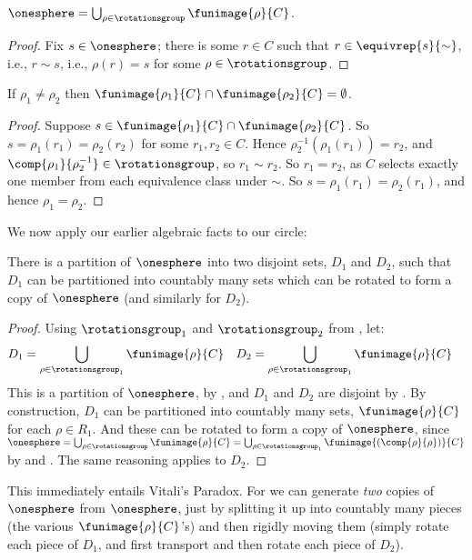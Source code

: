 \documentclass[../../../include/open-logic-section]{subfiles}
\begin{document}
\begin{lem}
$\onesphere = \bigcup_{\rho \in \rotationsgroup} \funimage{\rho}{C}$.
\end{lem}

\begin{proof}
Fix $s \in \onesphere$; there is some $r \in C$ such that $r \in
\equivrep{s}{\sim}$, i.e., $r \sim s$, i.e., $\rho(r) = s$ for some
$\rho \in \rotationsgroup$. 
\end{proof}

\begin{lem}
If $\rho_1 \neq \rho_2$ then $\funimage{\rho_1}{C} \cap \funimage{\rho_2}{C} = \emptyset$. 
\end{lem}

\begin{proof}
Suppose $s \in \funimage{\rho_{1}}{C} \cap \funimage{\rho_{2}}{C}$. So
$s = \rho_{1}(r_{1}) = \rho_{2}(r_{2})$ for some $r_{1}, r_{2} \in C$.
Hence $\rho^{-1}_2(\rho_1(r_1)) = r_2$, and
$\comp{\rho_1}{\rho^{-1}_2} \in \rotationsgroup$, so $r_{1} \sim
r_{2}$. So $r_1 = r_2$, as $C$ selects exactly one member from each
equivalence class under $\sim$. So $s = \rho_1(r_1) = \rho_2(r_1)$,
and hence $\rho_1 = \rho_2$.
\end{proof}

We now apply our earlier algebraic facts to our circle:

\begin{lem}
There is a partition of $\onesphere$ into two disjoint sets, $D_{1}$
and $D_{2}$, such that $D_{1}$ can be partitioned into countably many
sets which can be rotated to form a copy of $\onesphere$ (and
similarly for $D_{2}$).
\end{lem}

\begin{proof}
Using $\rotationsgroup_{1}$ and $\rotationsgroup_{2}$ from , let:
\begin{align*}
	D_{1} &= \bigcup_{\rho \in \rotationsgroup_1} \funimage{\rho}{C} & 
	D_{2} &= \bigcup_{\rho \in \rotationsgroup_1} \funimage{\rho}{C}
\end{align*}
This is a partition of $\onesphere$, by , and $D_1$
and $D_2$ are disjoint by . By construction,
$D_1$ can be partitioned into countably many sets,
$\funimage{\rho}{C}$ for each $\rho \in R_1$. And these can be rotated
to form a copy of $\onesphere$, since $\onesphere = \bigcup_{\rho \in
\rotationsgroup}\funimage{\rho}{C} = \bigcup_{\rho \in
\rotationsgroup_1}\funimage{(\comp{\rho}{\rho})}{C}$ by
 and . The same reasoning
applies to $D_2$. \end{proof}\noindent This immediately entails
Vitali's Paradox. For we can generate \emph{two} copies of
$\onesphere$ from $\onesphere$, just by splitting it up into countably
many pieces (the various $\funimage{\rho}{C}$'s) and then rigidly
moving them (simply rotate each piece of $D_1$, and first transport
and then rotate each piece of $D_2$).
\end{document}
